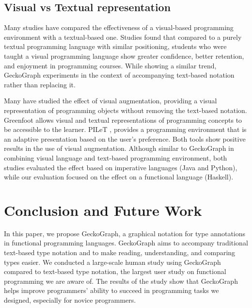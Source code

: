 \subsection{Visual vs Textual representation}

Many studies have compared the effectiveness of a visual-based programming environment with a textual-based one. Studies \cite{Noone2018-wl, Da_Silva_Ribeiro2014-tm, Cliburn2008-jo, Daly2011-is} found that compared to a purely textual programming language with similar positioning, students who were taught a visual programming language show greater confidence, better retention, and enjoyment in programming courses. While showing a similar trend, GeckoGraph experiments in the context of accompanying text-based notation rather than replacing it. 


Many have studied the effect of visual augmentation, providing a visual representation of programming objects without removing the text-based notation. Greenfoot \cite{Montero2010-uh} allows visual and textual representations of programming concepts to be accessible to the learner. PILeT \cite{Alshaigy2015-wy}, provides a programming environment that is an adaptive presentation based on the user's preference. Both tools show positive results in the use of visual augmentation. Although similar to GeckoGraph in combining visual language and text-based programming environment, both studies evaluated the effect based on imperative languages (Java and Python), while our evaluation focused on the effect on a functional language (Haskell).

\section{Conclusion and Future Work}
In this paper, we propose GeckoGraph, a graphical notation for type annotations in functional programming languages. GeckoGraph aims to accompany traditional text-based type notation and to make reading, understanding, and comparing types easier. We conducted a large-scale human study using GeckoGraph compared to text-based type notation, the largest user study on functional programming we are aware of. The results of the study show that GeckoGraph helps improve programmers' ability to succeed in programming tasks we designed, especially for novice programmers.

